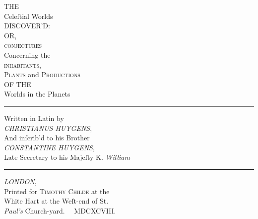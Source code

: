\documentclass[letterpaper]{book}
\begin{document}
\frontmatter

\thispagestyle{empty}

\begin{titlepage}
	\begin{center}
\LARGE THE \\
\small \phantom{bla bla}
{\fontsize{42}{42} Celeſtial Worlds} \\
\small \phantom{bla bla}
\LARGE DISCOVER'D: \\
OR, \\
\fontsize{36}{36}  \textsc{conjectures} \\
\tiny \phantom{bla bla}
\LARGE Concerning the \\
\fontsize{36}{36}  \textsc{inhabitants,} \\
\tiny \phantom{bla bla}
\Huge \textsc{Plants} and \textsc{Productions} \\
\small 
\phantom{blabla}
\Large OF THE \\
\large \phantom{blabla}
{\fontsize{42}{36} Worlds in the Planets} \\
\phantom{bla bla}
\hrule
\phantom{bla bla}
\Large
Written in Latin by \\
\emph{CHRISTIANUS HUYGENS}, \\
And inſcrib'd to his Brother \\
\emph{CONSTANTINE HUYGENS}, \\
Late Secretary to his Majeſty K. \emph{William} \\
\phantom{bla bla}
\hrule
\phantom{bla bla}
\textsc{\emph {LONDON}}, \\
Printed for \textsc{Timothy Childe} at the \\
White Hart at the Weſt-end of St. \\
\emph{Paul's} Church-yard. \, \, MDCXCVIII.
\end{center}
\end{titlepage}
\end{document}
